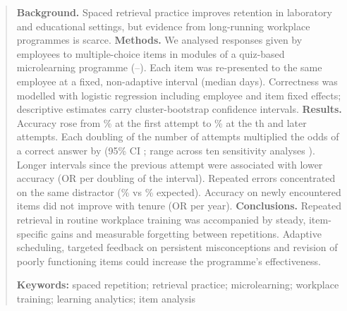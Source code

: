 
\begin{abstract}
\noindent\textbf{Background.} Spaced retrieval practice improves retention in laboratory and
educational settings, but evidence from long-running workplace programmes is scarce.
\textbf{Methods.} We analysed \NResponses{} responses given by \NEmployees{} employees to \NItems{}
multiple-choice items in \NModules{} modules of a quiz-based microlearning programme
(\DateStart--\DateEnd). Each item was re-presented to the same employee at a fixed, non-adaptive
interval (median \GapMedian{} days). Correctness was modelled with logistic regression including
employee and item fixed effects; descriptive estimates carry cluster-bootstrap confidence intervals.
\textbf{Results.} Accuracy rose from \AccAttOne\% at the first attempt to \AccAttMax\% at the
\AttMax{}th and later attempts. Each doubling of the number of attempts multiplied the odds of a
correct answer by \ORMOneAttempt{} (95\% CI \ORMOneAttemptCI; range across ten sensitivity analyses
\ORRange). Longer intervals since the previous attempt were associated with lower accuracy
(OR \ORMTwoGap{} per doubling of the interval). Repeated errors concentrated on the same distractor
(\SameDistractorPct\% vs \SameDistractorExpectedPop\% expected). Accuracy on newly encountered items
did not improve with tenure (OR \ORMThreeTenure{} per year). %
\textbf{Conclusions.} Repeated retrieval in routine workplace training was accompanied by steady,
item-specific gains and measurable forgetting between repetitions. Adaptive scheduling, targeted
feedback on persistent misconceptions and revision of poorly functioning items could increase the
programme's effectiveness.

\medskip\noindent\textbf{Keywords:} spaced repetition; retrieval practice; microlearning;
workplace training; learning analytics; item analysis
\end{abstract}

